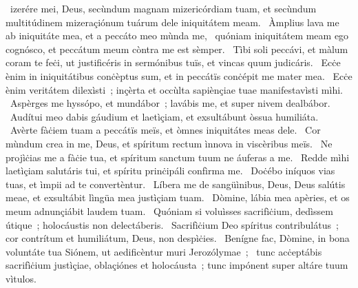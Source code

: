 \psalmChapterWithInscription{}
{  }
{%
~izerére mei, Deus, secùndum magnam mizericórdiam tuam, et secùndum multitúdinem mizeraçiónum tuárum dele iniquitátem meam. 
~Àmplius lava me ab iniquitáte mea, et a peccáto meo mùnda me, 
~quóniam iniquitátem meam ego cognósco, et peccátum meum còntra me est sèmper. 
~Tìbi soli peccávi, et màlum coram te feċi, ut justificéris in sermónibus tuïs, et vincas quum judicáris. 
~Ecċe ènim in iniquitátibus conċèptus sum, et in peccátïs conċépit me mater mea. 
~Ecċe ènim veritátem dilexìsti~; inçèrta et occùlta sapiènçiae tuae manifestavìsti mìhi. 
~Aspèrges me hyssópo, et mundábor~; lavábis me, et super nivem dealbábor. 
~Audítui meo dabis gáudium et laetìçiam, et exsultábunt òssua humiliáta. 
~Avèrte fàċiem tuam a peccátïs meïs, et òmnes iniquitátes meas dele. 
~Cor mùndum crea in me, Deus, et spíritum rectum ìnnova in viscèribus meïs. 
~Ne projìċias me a fàċie tua, et spíritum sanctum tuum ne áuferas a me. 
~Redde mìhi laetìçiam salutáris tui, et spíritu prinċipáli confìrma me. 
~Doċébo iníquos vias tuas, et ìmpii ad te convertèntur. 
~Líbera me de sangüìnibus, Deus, Deus salútis meae, et exsultábit lìngüa mea justìçiam tuam. 
~Dòmine, lábia mea apèries, et os meum adnunçiábit laudem tuam. 
~Quóniam si voluìsses sacrifìċium, dedìssem útique~; holocáustis non delectáberis. 
~Sacrifìċium Deo spíritus contribulátus~; cor contrítum et humiliátum, Deus, non despìċies. 
~Benígne fac, Dòmine, in bona voluntáte tua Siónem, ut aedificèntur muri Jerozólymae~; 
~tunc acċeptábis sacrifìċium justìçiae, oblaçiónes et holocáusta~; tunc impónent super altáre tuum vìtulos. 
}
